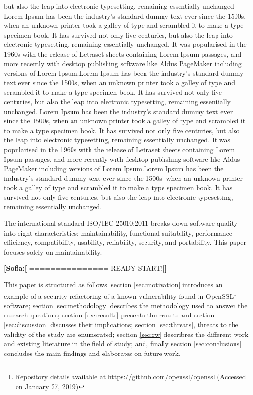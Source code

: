 \documentclass[10pt,conference]{IEEEtran}
\newcommand{\Sof}[1]{\textbf{[Sofia:[}{\color{red} #1}\textbf{]]}}
\begin{document}
but also the leap into electronic typesetting, remaining essentially unchanged. Lorem Ipsum has been the industry's standard dummy text ever since the 1500s, when an unknown printer took a galley of type and scrambled it to make a type specimen book. It has survived not only five centuries, but also the leap into electronic typesetting, remaining essentially unchanged. It was popularised in the 1960s with the release of Letraset sheets containing Lorem Ipsum passages, and more recently with desktop publishing software like Aldus PageMaker including versions of Lorem Ipsum.Lorem Ipsum has been the industry's standard dummy text ever since the 1500s, when an unknown printer took a galley of type and scrambled it to make a type specimen book. It has survived not only five centuries, but also the leap into electronic typesetting, remaining essentially unchanged. Lorem Ipsum has been the industry's standard dummy text ever since the 1500s, when an unknown printer took a galley of type and scrambled it to make a type specimen book. It has survived not only five centuries, but also the leap into electronic typesetting, remaining essentially unchanged. It was popularised in the 1960s with the release of Letraset sheets containing Lorem Ipsum passages, and more recently with desktop publishing software like Aldus PageMaker including versions of Lorem Ipsum.Lorem Ipsum has been the industry's standard dummy text ever since the 1500s, when an unknown printer took a galley of type and scrambled it to make a type specimen book. It has survived not only five centuries, but also the leap into electronic typesetting, remaining essentially unchanged.

The international standard ISO/IEC 25010:2011 breaks down software quality into eight characteristics: maintainability,
functional suitability, performance efficiency, compatibility, usability, reliability, security,
and portability. This paper focuses solely on maintainability.

\Sof{=============== READY START!}

This paper is structured as follows: section \ref{sec:motivation} introduces an example of a security refactoring of a known vulnerability found in OpenSSL\footnote{Repository details available at https://github.com/openssl/openssl (Accessed on January 27, 2019)} software; section \ref{sec:methodology} describes the methodology used to answer the research questions; section \ref{sec:results} presents the results and section \ref{sec:discussion} discusses their implications; section \ref{sec:threats}, threats to the validity of the study are enumerated; section \ref{sec:rw} describres the different work and existing literature in the field of study; and, finally section \ref{sec:conclusions} concludes the main findings and elaborates on future work.
\end{document}
